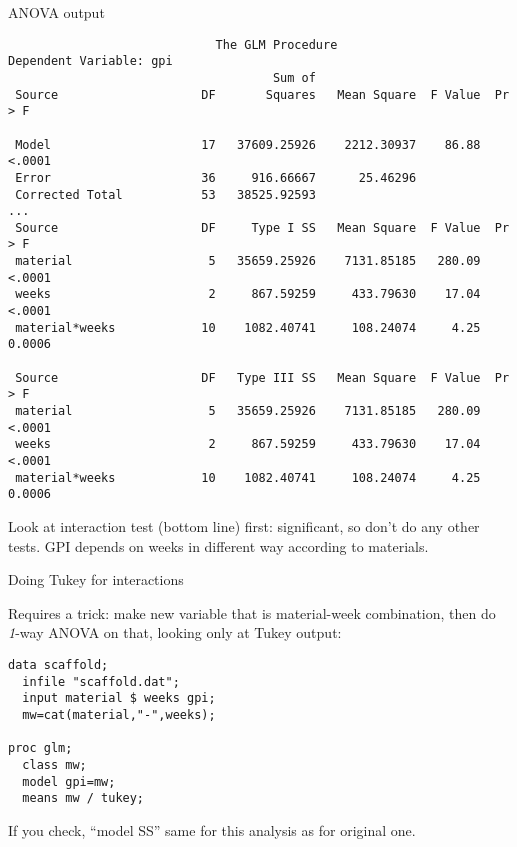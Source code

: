 \documentclass[pdf]{prosper}
\begin{document}
\begin{slide}{ANOVA output}

{\scriptsize
\begin{verbatim}
                             The GLM Procedure
Dependent Variable: gpi   
                                     Sum of
 Source                    DF       Squares   Mean Square  F Value  Pr > F

 Model                     17   37609.25926    2212.30937    86.88  <.0001
 Error                     36     916.66667      25.46296                 
 Corrected Total           53   38525.92593                               
...
 Source                    DF     Type I SS   Mean Square  F Value  Pr > F
 material                   5   35659.25926    7131.85185   280.09  <.0001
 weeks                      2     867.59259     433.79630    17.04  <.0001
 material*weeks            10    1082.40741     108.24074     4.25  0.0006

 Source                    DF   Type III SS   Mean Square  F Value  Pr > F
 material                   5   35659.25926    7131.85185   280.09  <.0001
 weeks                      2     867.59259     433.79630    17.04  <.0001
 material*weeks            10    1082.40741     108.24074     4.25  0.0006

\end{verbatim}
}

Look at interaction test (bottom line) first: significant, so don't do any other tests. GPI depends on weeks in different way according to materials.
  
\end{slide}

\begin{slide}{Doing Tukey for interactions}

Requires a trick: make new variable that is material-week combination, then do {\em 1}-way ANOVA on that, looking only at Tukey output:

\begin{verbatim}
data scaffold;
  infile "scaffold.dat";
  input material $ weeks gpi;
  mw=cat(material,"-",weeks);

proc glm;
  class mw;
  model gpi=mw;
  means mw / tukey;

\end{verbatim}

If you check, ``model SS'' same for this analysis as for original one.
  
\end{slide}
\end{document}
